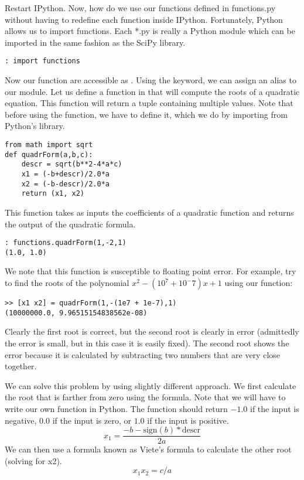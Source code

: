 Restart IPython.  Now, how do we use our functions defined in functions.py without having to redefine each function inside IPython.  Fortunately, Python allows us to import functions.  Each *.py is really a Python module which can be imported in the same fashion as the SciPy library.
\begin{lstlisting}[style=python]
: import functions
\end{lstlisting}

Now our function are accessible as .  Using the  keyword, we can assign an alias to our module.  Let us define a function in  that will compute the roots of a quadratic equation.  This function will return a tuple containing multiple values.  Note that before using the  function, we have to define it, which we do by importing  from Python's  library.
\begin{lstlisting}[style=python]
from math import sqrt
def quadrForm(a,b,c):
    descr = sqrt(b**2-4*a*c)
    x1 = (-b+descr)/2.0*a
    x2 = (-b-descr)/2.0*a
    return (x1, x2)
\end{lstlisting}

This function takes as inputs the coefficients of a quadratic function and returns the output of the quadratic formula.
\begin{lstlisting}[style=python]
: functions.quadrForm(1,-2,1)
(1.0, 1.0)
\end{lstlisting}

We note that this function is susceptible to floating point error. For example, try to find the roots of the polynomial $x^2 - (10^7 + 10^-7)x + 1$ using our function:

\begin{lstlisting}[style=python]
>> [x1 x2] = quadrForm(1,-(1e7 + 1e-7),1)
(10000000.0, 9.96515154838562e-08)
\end{lstlisting}

Clearly the first root is correct, but the second root is clearly in error (admittedly the error is small, but in this case it is easily fixed). The second root shows the error because it is calculated by subtracting two numbers that are very close together.

We can solve this problem by using slightly different approach. We first calculate the root that is farther from zero using the formula.  Note that we will have to write our own  function in Python.  The  function should return $-1.0$ if the input is negative, $0.0$ if the input is zero, or $1.0$ if the input is positive.
\[
x_1 = \frac{-b - \text{sign}(b)*\text{descr}}{2a}
\]
We can then use a formula known as Viete's formula to calculate the other root (solving for x2).
\[
x_1 x_2 = c/a
\]

